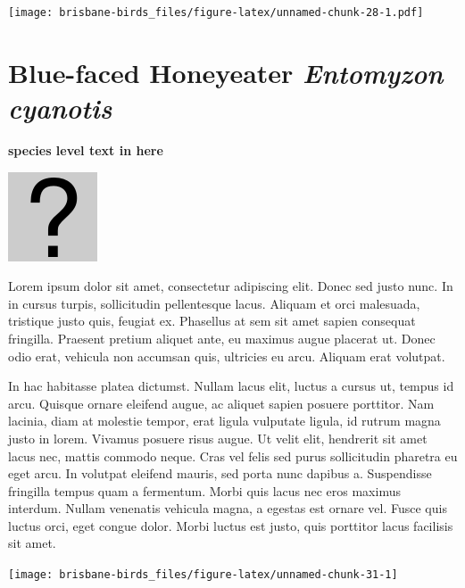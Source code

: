 \documentclass[]{book}
\let\origfigure\figure
\let\endorigfigure\endfigure
\renewenvironment{figure}[1][2] {
  \expandafter\origfigure\expandafter[H]
} {
  \endorigfigure
}
\begin{document}
\begin{figure}
\centering
\texttt{[image: brisbane-birds\_files/figure-latex/unnamed-chunk-28-1.pdf]}
\caption{\label{fig:unnamed-chunk-28}insert figure caption}
\end{figure}

\section{\texorpdfstring{Blue-faced Honeyeater \emph{Entomyzon
cyanotis}}{Blue-faced Honeyeater Entomyzon cyanotis}}\label{blue-faced-honeyeater-entomyzon-cyanotis}

\textbf{species level text in here}

\begin{figure}
\centering
\includegraphics{assets/missing.png}
\caption{No image for species}
\end{figure}

Lorem ipsum dolor sit amet, consectetur adipiscing elit. Donec sed justo
nunc. In in cursus turpis, sollicitudin pellentesque lacus. Aliquam et
orci malesuada, tristique justo quis, feugiat ex. Phasellus at sem sit
amet sapien consequat fringilla. Praesent pretium aliquet ante, eu
maximus augue placerat ut. Donec odio erat, vehicula non accumsan quis,
ultricies eu arcu. Aliquam erat volutpat.

In hac habitasse platea dictumst. Nullam lacus elit, luctus a cursus ut,
tempus id arcu. Quisque ornare eleifend augue, ac aliquet sapien posuere
porttitor. Nam lacinia, diam at molestie tempor, erat ligula vulputate
ligula, id rutrum magna justo in lorem. Vivamus posuere risus augue. Ut
velit elit, hendrerit sit amet lacus nec, mattis commodo neque. Cras vel
felis sed purus sollicitudin pharetra eu eget arcu. In volutpat eleifend
mauris, sed porta nunc dapibus a. Suspendisse fringilla tempus quam a
fermentum. Morbi quis lacus nec eros maximus interdum. Nullam venenatis
vehicula magna, a egestas est ornare vel. Fusce quis luctus orci, eget
congue dolor. Morbi luctus est justo, quis porttitor lacus facilisis sit
amet.

\begin{figure}
\texttt{[image: brisbane-birds\_files/figure-latex/unnamed-chunk-31-1]} \caption{insert figure caption}\label{fig:unnamed-chunk-31}
\end{figure}
\end{document}
